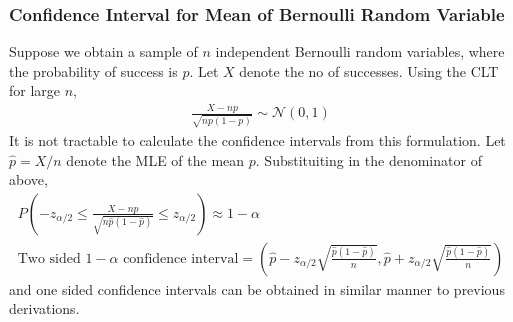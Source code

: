 \documentclass[../probability-notes.tex]{subfiles}
\begin{document}
    \subsubsection{Confidence Interval for Mean of Bernoulli Random Variable}
    Suppose we obtain a sample of $n$ independent Bernoulli random variables, where the probability of success is $p$. Let $X$ denote the no of successes. Using the CLT for large $n$,
    \begin{align*}
        \frac{X - np}{\sqrt{np(1-p)}} \sim \mathcal{N}(0, 1)
    \end{align*}
    It is not tractable to calculate the confidence intervals from this formulation. Let $\hat{p} = X/n$ denote the MLE of the mean $p$. Substituiting in the denominator of above,
    \begin{align*}
        P(-z_{\alpha/2} \leq \frac{X - np}{\sqrt{n\hat{p}(1-\hat{p})}} \leq z_{\alpha/2}) \approx 1-\alpha\\
        \text{Two sided $1-\alpha$ confidence interval} = (\hat{p} - z_{\alpha/2}\sqrt{\frac{\hat{p}(1-\hat{p})}{n}}, \hat{p} + z_{\alpha/2}\sqrt{\frac{\hat{p}(1-\hat{p})}{n}})
    \end{align*}
    and one sided confidence intervals can be obtained in similar manner to previous derivations.
\end{document}
